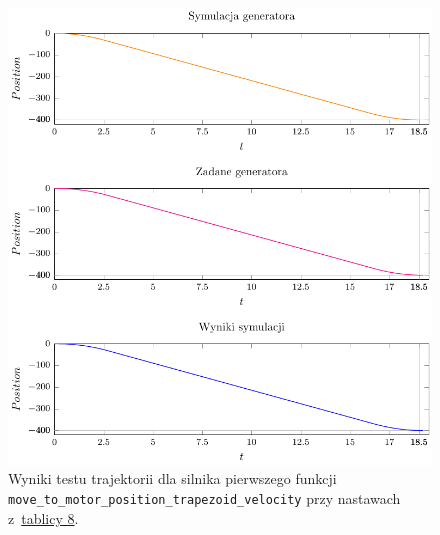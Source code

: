 \documentclass[a4paper, 12pt]{article}
\begin{document}
	\begin{figure}[H]
		\centering
		\includegraphics[scale=1.2]{raport_graphs/simpMPVrevers.pdf}
		\caption{Wyniki testu trajektorii dla silnika pierwszego funkcji \texttt{move\_to\_motor\_position\_trapezoid\_velocity} przy nastawach z~\hyperref[tab:setup1]{tablicy 8}.}
		\label{fig:simpMPVrevers}
	\end{figure}
		
\end{document}
